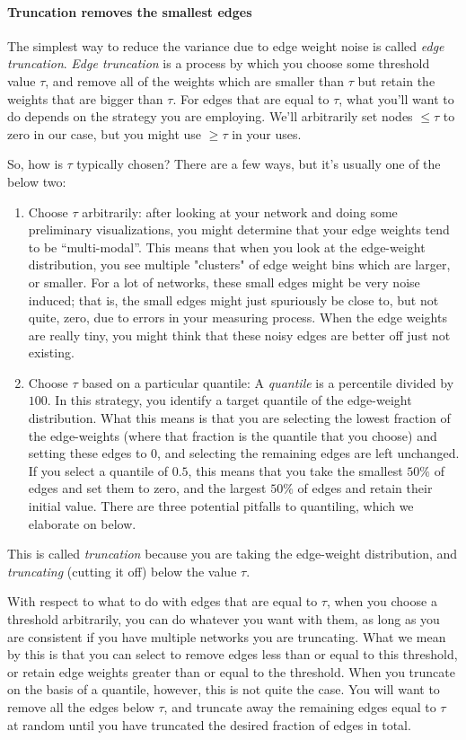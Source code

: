 \paragraph{Truncation removes the smallest edges}

The simplest way to reduce the variance due to edge weight noise is called \emph{edge truncation}. \textit{Edge truncation} is a process by which you choose some threshold value $\tau$, and remove all of the weights which are smaller than $\tau$ but retain the weights that are bigger than $\tau$. For edges that are equal to $\tau$, what you'll want to do depends on the strategy you are employing. We'll arbitrarily set nodes $\leq \tau$ to zero in our case, but you might use $\geq \tau$ in your uses.

So, how is $\tau$ typically chosen? There are a few ways, but it's usually one of the below two:
\begin{enumerate}
    \item Choose $\tau$ arbitrarily: after looking at your network and doing some preliminary visualizations, you might determine that your edge weights tend to be ``multi-modal''. This means that when you look at the edge-weight distribution, you see multiple "clusters" of edge weight bins which are larger, or smaller. For a lot of networks, these small edges might be very noise induced; that is, the small edges might just spuriously be close to, but {not quite}, zero, due to errors in your measuring process. When the edge weights are really tiny, you might think that these noisy edges are better off just not existing.
    \item Choose $\tau$ based on a particular quantile: A \textit{quantile} is a percentile divided by $100$. In this strategy, you identify a target quantile of the edge-weight distribution. What this means is that you are selecting the lowest {fraction} of the edge-weights (where that fraction is the quantile that you choose) and setting these edges to $0$, and selecting the remaining edges are left unchanged. If you select a quantile of $0.5$, this means that you take the smallest $50\%$ of edges and set them to zero, and the largest $50\%$ of edges and retain their initial value. There are three potential pitfalls to quantiling, which we elaborate on below.
\end{enumerate}
This is called \emph{truncation} because you are taking the edge-weight distribution, and \emph{truncating} (cutting it off) below the value $\tau$.

With respect to what to do with edges that are equal to $\tau$, when you choose a threshold arbitrarily, you can do whatever you want with them, as long as you are consistent if you have multiple networks you are truncating. What we mean by this is that you can select to remove edges less than or equal to this threshold, or retain edge weights greater than or equal to the threshold. When you truncate on the basis of a quantile, however, this is not quite the case. You will want to remove all the edges below $\tau$, and truncate away the remaining edges equal to $\tau$ at random until you have truncated the desired fraction of edges in total.

